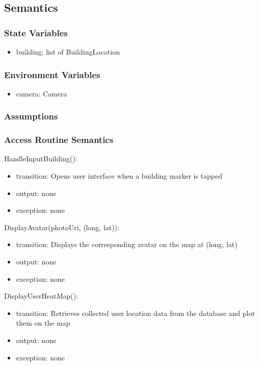 \documentclass[12pt, titlepage]{article}
\begin{document}
\subsection{Semantics}

\subsubsection{State Variables}

\begin{itemize}
\item building: list of BuildingLocation
\end{itemize}

\subsubsection{Environment Variables}
\begin{itemize}
\item camera: Camera
\end{itemize}
  

\subsubsection{Assumptions}

\subsubsection{Access Routine Semantics}

\noindent HandleInputBuilding():
\begin{itemize}
\item transition: Opens user interface when a building marker is tapped
\item output: none
\item exception: none
\end{itemize}

\noindent DisplayAvatar(photoUri, (long, lat)):
\begin{itemize}
\item transition: Displays the corresponding avatar on the map at (long, lat)
\item output: none
\item exception: none
\end{itemize}

\noindent DisplayUserHeatMap():
\begin{itemize}
\item transition: Retrieves collected user location data from the database and plot them on the map
\item output: none
\item exception: none
\end{itemize}
\end{document}
